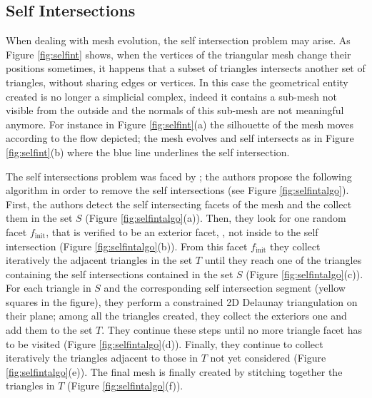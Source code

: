 \subsection{Self Intersections}
When dealing with mesh evolution, the self intersection problem may arise. 
As Figure \ref{fig:selfint} shows, when the vertices of the triangular mesh change their positions sometimes, it happens  that a subset of triangles intersects another set of triangles, without sharing edges or vertices. 
In this case the geometrical entity created is no longer a simplicial complex, indeed it contains a sub-mesh not visible from the outside and the normals of this sub-mesh are not meaningful anymore.
For instance in Figure \ref{fig:selfint}(a) the silhouette of the mesh moves according to the flow depicted;  the mesh evolves and self intersects  as in Figure \ref{fig:selfint}(b)  where the blue line underlines the self intersection.

The self intersections problem was faced by \cite{zaharescu2007transformesh}; the authors propose the following algorithm in order to remove the self intersections (see Figure \ref{fig:selfintalgo}).
First, the authors detect the self intersecting facets of the mesh and the collect them in the  set  $\mathit{S}$ (Figure \ref{fig:selfintalgo}(a)).
Then, they look for one random facet $f_{\text{init}}$, that is verified to be an exterior facet, \ie, not inside to the self intersection (Figure \ref{fig:selfintalgo}(b)).
From this facet $f_{\text{init}}$ they collect iteratively the adjacent triangles in the set  $\mathit{T}$ until they reach one of the triangles containing the self intersections contained in the set $\mathit{S}$ (Figure \ref{fig:selfintalgo}(c)).  
For each triangle in $\mathit{S}$ and the corresponding self intersection segment (yellow squares in the figure), they perform a constrained 2D Delaunay triangulation on their plane; among all the triangles created, they collect the exteriors one and add them to the set $\mathit{T}$.
They continue these steps until no more triangle facet has to be visited (Figure \ref{fig:selfintalgo}(d)).
Finally,  they continue to collect iteratively the triangles adjacent to those in $\mathit{T}$ not yet considered (Figure \ref{fig:selfintalgo}(e)). 
The final mesh is finally created by stitching together the triangles in $\mathit{T}$ (Figure \ref{fig:selfintalgo}(f)).

